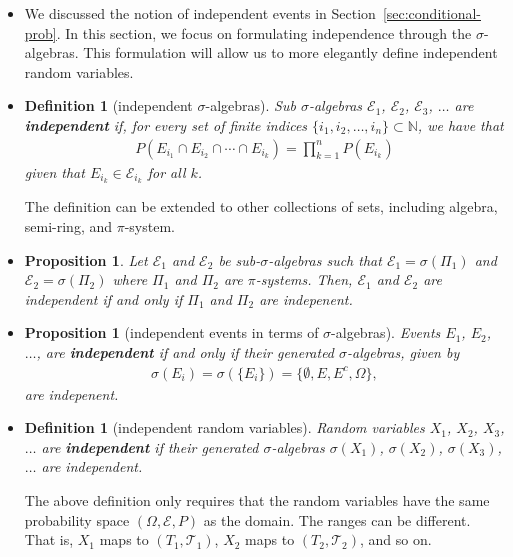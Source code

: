 \documentclass[10pt]{article}
\newtheorem{definition}[lemma]{Definition}
\newtheorem{proposition}[lemma]{Proposition}
\numberwithin{lemma}{section}
\newcommand{\mcal}[1]{\mathcal{#1}}
\newcommand{\Nat}{\mathbb{N}}
\begin{document}
\begin{itemize}
  \item We discussed the notion of independent events in Section~\ref{sec:conditional-prob}. In this section, we focus on formulating independence through the $\sigma$-algebras. This formulation will allow us to more elegantly define independent random variables. 
    
  \item \begin{definition}[independent $\sigma$-algebras]
    Sub $\sigma$-algebras $\mcal{E}_1$, $\mcal{E}_2$, $\mcal{E}_3$, $\dotsc$ are {\bf independent} if, for every set of finite indices $\{i_1, i_2, \dotsc, i_n\} \subset \Nat$, we have that
    \begin{align*}
      P(E_{i_1} \cap E_{i_2} \cap \dotsb \cap E_{i_k}) = \prod_{k=1}^n P(E_{i_k})
    \end{align*}
    given that $E_{i_k} \in \mcal{E}_{i_k}$ for all $k$.  
  \end{definition}
  The definition can be extended to other collections of sets, including algebra, semi-ring, and $\pi$-system.

  \item \begin{proposition}
    Let $\mcal{E}_1$ and $\mcal{E}_2$ be sub-$\sigma$-algebras such that $\mcal{E}_1 = \sigma(\Pi_1)$ and $\mcal{E}_2 = \sigma(\Pi_2)$ where $\Pi_1$ and $\Pi_2$ are $\pi$-systems. Then, $\mcal{E}_1$ and $\mcal{E}_2$ are independent if and only if $\Pi_1$ and $\Pi_2$ are indepenent.  
  \end{proposition}

  \item \begin{proposition}[independent events in terms of $\sigma$-algebras]
    Events $E_1$, $E_2$, $\dotsc$, are {\bf independent} if and only if their generated $\sigma$-algebras, given by
    \begin{align*}
      \sigma(E_i) = \sigma(\{ E_i \}) = \{ \emptyset, E, E^c, \Omega \},
    \end{align*}
    are indepenent.
  \end{proposition}

  \item \begin{definition}[independent random variables]
    Random variables $X_1$, $X_2$, $X_3$, $\dotsc$ are {\bf independent} if their generated $\sigma$-algebras $\sigma(X_1)$, $\sigma(X_2)$, $\sigma(X_3)$, $\dotsc$ are independent.
  \end{definition}
  The above definition only requires that the random variables have the same probability space $(\Omega,\mcal{E},P)$ as the domain. The ranges can be different. That is, $X_1$ maps to $(T_1, \mcal{T}_1)$, $X_2$ maps to $(T_2, \mcal{T}_2)$, and so on.


\end{itemize}
\end{document}
